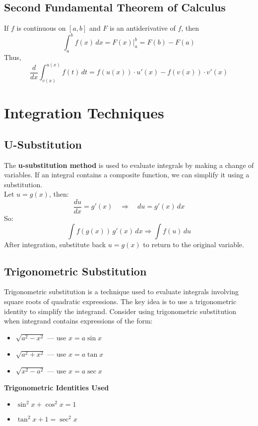 \documentclass[11pt]{article}
\begin{document}
\subsection{Second Fundamental Theorem of Calculus}
If $f$ is continuous on $[a,b]$ and $F$ is an antiderivative of $f$, then
\[
    \int_a^bf(x)\,dx=\left.F(x)\right|_a^b=F(b)-F(a)
\]
Thus,
\[
    \boxed{
        \frac{d}{dx}\int_{v(x)}^{u(x)}f(t)\,dt=f(u(x))\cdot u'(x) - f(v(x)) \cdot v'(x)
    }
\]
\section{Integration Techniques}
\subsection{U-Substitution}
The \textbf{u-substitution method} is used to evaluate integrals by making a change of variables. 
If an integral contains a composite function, we can simplify it using a substitution.\\
Let $u = g(x)$, then:
\[
    \frac{du}{dx} = g'(x) \quad \Rightarrow \quad du = g'(x)\,dx
\]
So:
\[
    \int f(g(x))\,g'(x)\,dx \Rightarrow\int f(u)\,du
\]After integration, 
substitute back $u = g(x)$ to return to the original variable.
\subsection{Trigonometric Substitution}
Trigonometric substitution is a technique used to evaluate integrals involving square roots of quadratic expressions. The key idea is to use a trigonometric identity to simplify the integrand.
Consider using trigonometric substitution when integrand contains expressions of the form:

\begin{itemize}
    \item $\sqrt{a^2 - x^2}$ — use $x = a \sin x$
    \item $\sqrt{a^2 + x^2}$ — use $x = a \tan x$
    \item $\sqrt{x^2 - a^2}$ — use $x = a \sec x$
\end{itemize}\textbf{Trigonometric Identities Used}
\begin{itemize}
    \item $\sin^2 x + \cos^2 x = 1$
    \item $\tan^2 x + 1 = \sec^2 x$
\end{itemize}
\end{document}
